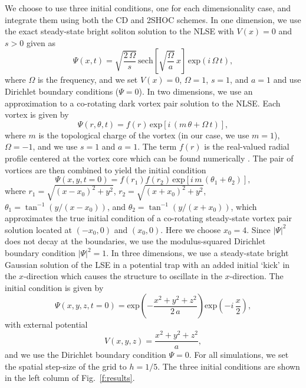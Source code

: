 \documentclass{article}
\begin{document}
We choose to use three initial conditions, one for each dimensionality case,
and integrate them using both the CD and 2SHOC schemes.  
In one dimension, we use the exact steady-state bright soliton solution to the NLSE with $V(x)=0$ and $s>0$ given as \cite{SOL_Bright_Gray_Dark_Opt}
\begin{equation}
\label{soliton}
\Psi(x,t) = \sqrt{\frac{2\,\Omega}{s}}\,\mbox{sech}\left[\sqrt{\frac{\Omega}{a}}\,x\right]\,\mbox{exp}\left(i\,\Omega\,t\right),
\end{equation} 
where $\Omega$ is the frequency, and we set $V(x)=0$, $\Omega=1$, $s=1$, and $a=1$ and use Dirichlet boundary conditions ($\Psi = 0$).  In two dimensions, we use an approximation to a co-rotating dark vortex pair solution to the NLSE.  Each vortex is given by \cite{BEC_DYN_NONLIN}
\begin{equation}
\label{exmp2Dvort}
\Psi(r,\theta,t) = f(r)\,\mbox{exp}[i\,(m\,\theta + \Omega\,t)],
\end{equation}
where $m$ is the topological charge of the vortex (in our case, we use $m=1$), $\Omega = -1$, and we use $s=1$ and $a=1$.  The term $f(r)$ is the real-valued radial profile centered at the vortex core which can be found numerically \cite{ME_DISS}.  The pair of vortices are then combined to yield the initial condition
\[
\Psi(x,y,t=0) = f(r_1)f(r_2)\,\mbox{exp}[i\,m\,(\theta_1 + \theta_2)],
\]
where $r_1=\sqrt{(x-x_0)^2 + y^2}$, $r_2=\sqrt{(x+x_0)^2 + y^2}$, $\theta_1=\tan^{-1}(y/(x-x_0))$, and $\theta_2=\tan^{-1}(y/(x+x_0))$, which approximates the true initial condition of a co-rotating steady-state vortex pair solution
located at $(-x_0,0)$ and $(x_0,0)$. Here we choose $x_0=4$.  
Since $|\Psi|^2$ does not decay at the boundaries, we use the modulus-squared Dirichlet boundary condition $|\Psi|^2 = 1$.
In three dimensions, we use a steady-state bright Gaussian solution of the LSE in a potential trap with an added initial `kick' in the $x$-direction which causes the structure to oscillate in the $x$-direction.  The initial condition is given by
\begin{equation}
\label{3dexpsol}
\Psi(x,y,z,t=0) = \mbox{exp}\left(-\frac{x^2 + y^2 + z^2}{2\,a}\right) \mbox{exp}\left(-i\,\frac{x}{2}\right),
\end{equation}
with external potential
\begin{equation}
\label{3dexpsolv}
V(x,y,z) = \frac{x^2 + y^2 +z^2}{a},
\end{equation}
and we use the Dirichlet boundary condition $\Psi = 0$.  
For all simulations, we set the spatial step-size of the grid to $h=1/5$.  The three initial conditions are shown in the left column of Fig.~\ref{f:results}.
\end{document}
